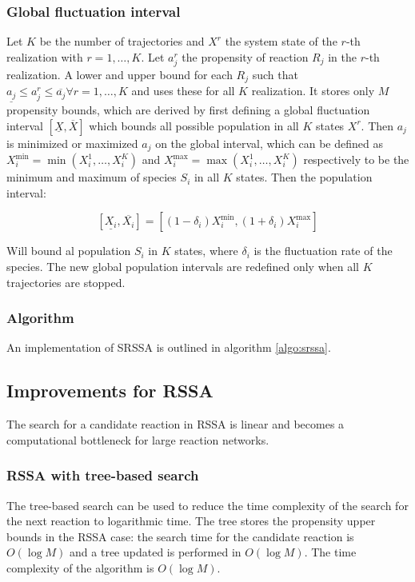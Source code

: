     \subsubsection{Global fluctuation interval}
    Let $K$ be the number of trajectories and $X^r$ the system state of the $r$-th realization with $r = 1,\dots, K$.
    Let $a_j^r$ the propensity of reaction $R_j$ in the $r$-th realization.
    A lower and upper bound for each $R_j$ such that $\underline{a_j}\le a_j^r\le \overline{a_j}\forall r=1,\dots,K$ and uses these for all $K$ realization.
    It stores only $M$ propensity bounds, which are derived by first defining a global fluctuation interval $[\underline{X},\overline{X}]$ which bounds all possible population in all $K$ states $X^r$.
    Then $a_j$ is minimized or maximized $a_j$ on the global interval, which can be defined as $X_i^{\min} = \min(X_i^1, \dots, X_i^K)$ and $X_i^{\max} = \max(X_i^1, \dots, X_i^K)$ respectively to be the minimum and maximum of species $S_i$ in all $K$ states.
    Then the population interval:

    $$[\underline{X_i}, \overline{X_i}] = [(1-\delta_i)X_i^{\min}, (1+\delta_i)X_i^{\max}]$$

    Will bound al population $S_i$ in $K$ states, where $\delta_i$ is the fluctuation rate of the species.
    The new global population intervals are redefined only when all $K$ trajectories are stopped.

    \subsubsection{Algorithm}
    An implementation of SRSSA is outlined in algorithm \ref{algo:srssa}.

    

  \subsection{Improvements for RSSA}
  The search for a candidate reaction in RSSA is linear and becomes a computational bottleneck for large reaction networks.

    \subsubsection{RSSA with tree-based search}
    The tree-based search can be used to reduce the time complexity of the search for the next reaction to logarithmic time.
    The tree stores the propensity upper bounds in the RSSA case: the search time for the candidate reaction is $O(\log M)$ and a tree updated is performed in $O(\log M)$.
    The time complexity of the algorithm is $O(\log M)$.

